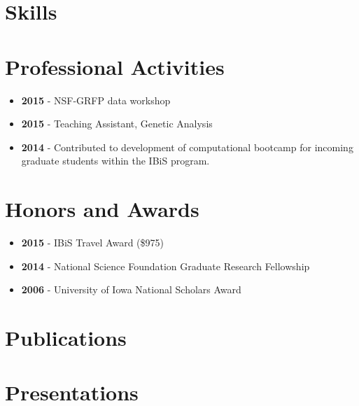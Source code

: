 \documentclass[11pt,a4paper,sans]{moderncv}
\begin{document}
\section{Skills}

\section{Professional Activities}
\begin{itemize}%
\item \textbf{2015} - NSF-GRFP data workshop
\item \textbf{2015} - Teaching Assistant, Genetic Analysis
\item \textbf{2014} - Contributed to development of computational bootcamp for incoming graduate students within the IBiS program.
\end{itemize}

\section{Honors and Awards}
\begin{itemize}%
\item \textbf{2015} - IBiS Travel Award (\$975)
\item \textbf{2014} - National Science Foundation Graduate Research Fellowship 
\item \textbf{2006} - University of Iowa National Scholars Award
\end{itemize}


\newpage
\section{Publications}

\nocite{*}


\printbibliography[type=article,heading=none]
\newpage
\section{Presentations}
\begin{refsection}
\nocite{*}
\printbibliography[type=presentation,heading=none]
\end{refsection}
\end{document}
